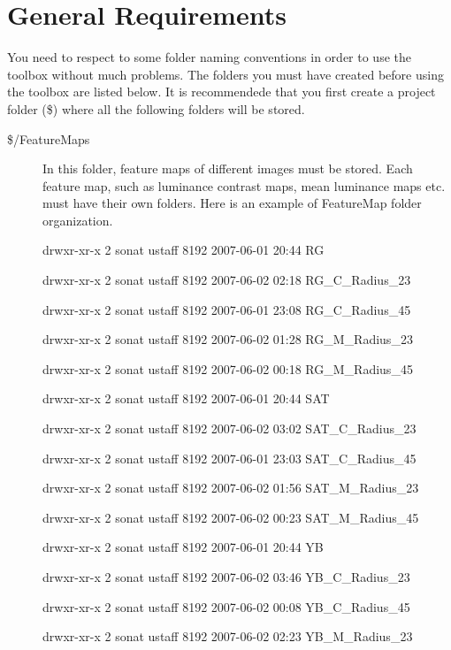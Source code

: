 \documentclass[a4paper,10pt]{report}
\begin{document}
\section{General Requirements}

You need to respect to some folder naming conventions in order to use the toolbox without much problems. The folders you must have created before using the toolbox are listed below. It is recommendede that you first create a project folder (\$) where all the following folders will be stored.
\begin{description}
 
\item[\$/FeatureMaps]

In this folder, feature maps of different images must be stored. Each feature map, such as luminance contrast maps, mean luminance maps etc. must have their own folders. Here is an example of FeatureMap folder organization. 

\hspace{2cm}
\begin{scriptsize}

drwxr-xr-x 2 sonat ustaff 8192 2007-06-01 20:44 RG

drwxr-xr-x 2 sonat ustaff 8192 2007-06-02 02:18 RG\_C\_Radius\_23 

drwxr-xr-x 2 sonat ustaff 8192 2007-06-01 23:08 RG\_C\_Radius\_45

drwxr-xr-x 2 sonat ustaff 8192 2007-06-02 01:28 RG\_M\_Radius\_23

drwxr-xr-x 2 sonat ustaff 8192 2007-06-02 00:18 RG\_M\_Radius\_45

drwxr-xr-x 2 sonat ustaff 8192 2007-06-01 20:44 SAT

drwxr-xr-x 2 sonat ustaff 8192 2007-06-02 03:02 SAT\_C\_Radius\_23

drwxr-xr-x 2 sonat ustaff 8192 2007-06-01 23:03 SAT\_C\_Radius\_45

drwxr-xr-x 2 sonat ustaff 8192 2007-06-02 01:56 SAT\_M\_Radius\_23

drwxr-xr-x 2 sonat ustaff 8192 2007-06-02 00:23 SAT\_M\_Radius\_45

drwxr-xr-x 2 sonat ustaff 8192 2007-06-01 20:44 YB

drwxr-xr-x 2 sonat ustaff 8192 2007-06-02 03:46 YB\_C\_Radius\_23

drwxr-xr-x 2 sonat ustaff 8192 2007-06-02 00:08 YB\_C\_Radius\_45

drwxr-xr-x 2 sonat ustaff 8192 2007-06-02 02:23 YB\_M\_Radius\_23


\end{scriptsize}
\end{description}
\end{document}
